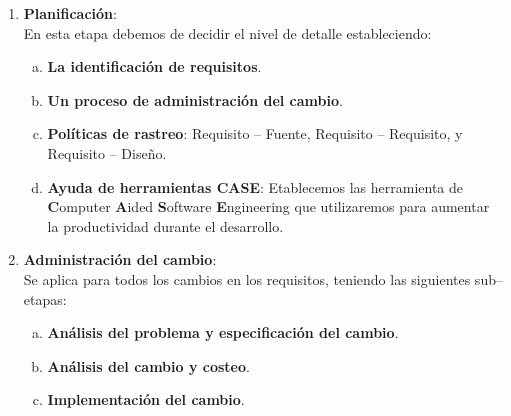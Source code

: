 \begin{enumerate}
    \item \textbf{Planificación}:\\
          En esta etapa debemos de decidir el nivel de detalle estableciendo:
          \begin{enumerate}[a.]
              \item \textbf{La identificación de requisitos}.
              \item \textbf{Un proceso de administración del cambio}.
              \item \textbf{Políticas de rastreo}: Requisito -- Fuente, Requisito -- Requisito, y Requisito -- Diseño.
              \item \textbf{Ayuda de herramientas CASE}: Etablecemos las herramienta de \textbf{C}omputer \textbf{A}ided \textbf{S}oftware \textbf{E}ngineering que utilizaremos para aumentar la productividad durante el desarrollo.
          \end{enumerate}

    \item \textbf{Administración del cambio}:\\
          Se aplica para todos los cambios en los requisitos, teniendo las siguientes sub--etapas:
          \begin{enumerate}[a.]
              \item \textbf{Análisis del problema y especificación del cambio}.
              \item \textbf{Análisis del cambio y costeo}.
              \item \textbf{Implementación del cambio}.
          \end{enumerate}

\end{enumerate}

